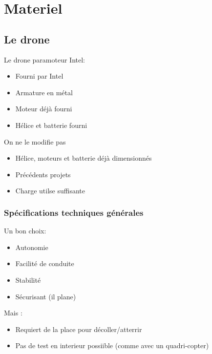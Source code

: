 \documentclass[transparent]{beamer}
\begin{document}
\section{Materiel}
\subsection{Le drone}

\begin{frame}
	\begin{block}{Le drone paramoteur Intel:}
			\begin{itemize}
				\item Fourni par Intel
				\item Armature en métal
				\item Moteur déjà fourni
				\item Hélice et batterie fourni
			\end{itemize}
	\end{block}
	\begin{block}{On ne le modifie pas}
			\begin{itemize}
				\item Hélice, moteurs et batterie déjà dimensionnés
				\item Précédents projets
				\item Charge utilse suffisante
			\end{itemize}
	\end{block}
\end{frame}

\begin{frame}
\frametitle{Spécifications techniques générales}
	\begin{block}{Un bon choix:}
			\begin{itemize}
				\item Autonomie
				\item Facilité de conduite
				\item Stabilité
				\item Sécurisant (il plane)
			\end{itemize}
	\end{block}
	\begin{block}{Mais :}
			\begin{itemize}
				\item Requiert de la place pour décoller/atterrir
				\item Pas de test en interieur possiible (comme avec un quadri-copter)
			\end{itemize}
	\end{block}
\end{frame}
\end{document}
